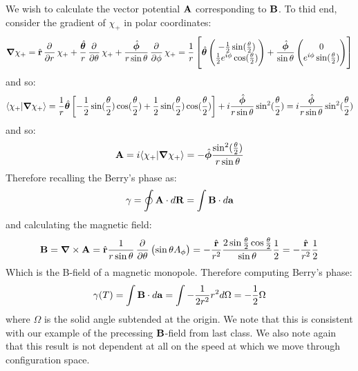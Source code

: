 We wish to calculate the vector potential $\mathbf{A}$ corresponding to $\mathbf{B}$. To thid end, consider the gradient of $\chi_+$ in polar coordinates:
\begin{equation}
    \nabla \chi_+ = \rhat \dpd{}{r}\chi_+ + \frac{\thetahat}{r}\dpd{}{\theta}\chi_+ + \frac{\phihat}{r\sin\theta}\dpd{}{\phi}\chi_+ = \frac{1}{r}\left[\thetahat\m{-\frac{1}{2}\sin(\frac{\theta}{2}) \\ \frac{1}{2}e^{i\phi}\cos(\frac{\theta}{2})} + \frac{\phihat}{\sin\theta}\m{0 \\ e^{i\phi}\sin(\frac{\theta}{2})}\right]
\end{equation}
and so:
\begin{equation}
    \braket{\chi_+}{\nabla \chi_+} = \frac{1}{r}\thetahat\left[-\frac{1}{2}\sin(\frac{\theta}{2})\cos(\frac{\theta}{2}) + \frac{1}{2}\sin(\frac{\theta}{2})\cos(\frac{\theta}{2})\right] + i\frac{\phihat}{r\sin\theta}\sin^2(\frac{\theta}{2}) = i\frac{\phihat}{r\sin\theta}\sin^2(\frac{\theta}{2})
\end{equation}
and so:
\begin{equation}
    \v{A} = i\braket{\chi_+}{\nabla \chi_+} = -\phihat\frac{\sin^2(\frac{\theta}{2})}{r\sin\theta}
\end{equation}
Therefore recalling the Berry's phase as:
\begin{equation}
    \gamma = \oint \mathbf{A} \cdot d\mathbf{R} = \int \mathbf{B} \cdot d\mathbf{a}
\end{equation}
and calculating the magnetic field:
\begin{equation}
    \v{B} = \nabla \times \v{A} = \rhat \frac{1}{r\sin\theta}\dpd{}{\theta}\left(\sin\theta A_\phi\right) = -\frac{\rhat}{r^2}\frac{2\sin\frac{\theta}{2}\cos\frac{\theta}{2}}{\sin\theta}\frac{1}{2} = -\frac{\rhat}{r^2}\frac{1}{2}
\end{equation}
Which is the B-field of a magnetic monopole. Therefore computing Berry's phase:
\begin{equation}
    \gamma(T) = \int \mathbf{B} \cdot d\mathbf{a} = \int - \frac{1}{2r^2}r^2 d\Omega = -\frac{1}{2}\Omega
\end{equation}
where $\Omega$ is the solid angle subtended at the origin. We note that this is consistent with our example of the precessing $\mathbf{B}$-field from last class. We also note again that this result is not dependent at all on the speed at which we move through configuration space.

